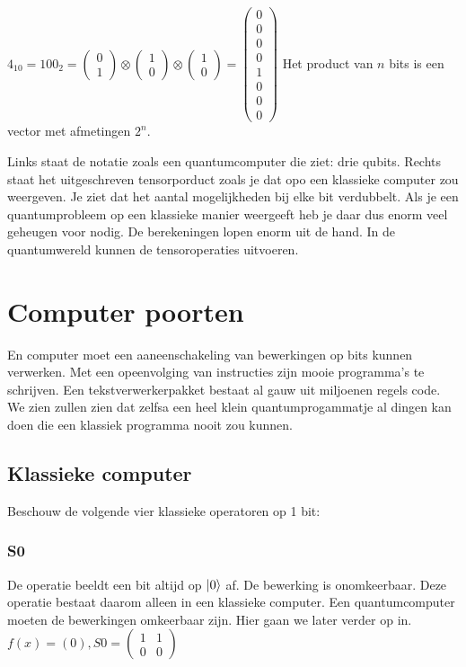 \documentclass[../../main.tex]{subfiles}
\begin{document}
$4_{10}=100_{2}=
\begin{pmatrix}
0\\
1
\end{pmatrix}
\otimes
\begin{pmatrix}
1\\
0
\end{pmatrix}
\otimes
\begin{pmatrix}
1\\
0
\end{pmatrix}
=
\begin{pmatrix}
0\\
0\\
0\\
0\\
1\\
0\\
0\\
0
\end{pmatrix}
$
Het product van $n$ bits is een vector met afmetingen  $2^n$. 

Links staat de notatie zoals een quantumcomputer die ziet: drie qubits. Rechts staat het uitgeschreven tensorporduct zoals je dat opo een klassieke computer zou weergeven.  Je ziet dat het aantal mogelijkheden bij elke bit verdubbelt. Als je een quantumprobleem op een klassieke manier weergeeft heb je daar dus enorm veel geheugen voor nodig. De berekeningen lopen enorm uit de hand.
In de quantumwereld kunnen de tensoroperaties uitvoeren.
\section*{Computer poorten}
En computer moet een aaneenschakeling van bewerkingen op bits kunnen verwerken. Met een opeenvolging van instructies zijn mooie programma's te schrijven. Een tekstverwerkerpakket bestaat al gauw uit miljoenen regels code. We zien zullen zien dat zelfsa een heel klein quantumprogammatje al dingen kan doen die een klassiek programma nooit zou kunnen.


\subsection*{Klassieke computer}
Beschouw de volgende vier klassieke operatoren op 1 bit:

\subsubsection{S0}
De operatie beeldt een bit altijd op $\ket{0}$ af. De bewerking is onomkeerbaar. Deze operatie bestaat daarom alleen in een klassieke computer. Een quantumcomputer moeten de bewerkingen omkeerbaar zijn. Hier gaan we later verder op in.
$f(x)=(0), S0=\begin{pmatrix}
1&1\\
0&0
\end{pmatrix}
$
\end{document}
